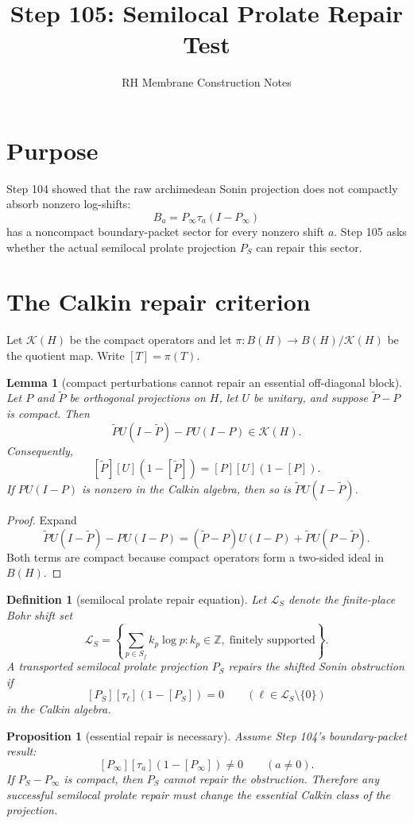 \documentclass[11pt]{article}
\title{Step 105: Semilocal Prolate Repair Test}
\author{RH Membrane Construction Notes}
\date{}
\newtheorem{lemma}{Lemma}
\newtheorem{proposition}{Proposition}
\newtheorem{definition}{Definition}
\begin{document}
\maketitle

\section{Purpose}
Step 104 showed that the raw archimedean Sonin projection does not compactly absorb nonzero log-shifts:
\[
B_a=P_\infty\tau_a(I-P_\infty)
\]
has a noncompact boundary-packet sector for every nonzero shift $a$. Step 105 asks whether the actual semilocal prolate projection $P_S$ can repair this sector.

\section{The Calkin repair criterion}
Let $\mathcal K(H)$ be the compact operators and let $\pi:B(H)\to B(H)/\mathcal K(H)$ be the quotient map. Write $[T]=\pi(T)$.

\begin{lemma}[compact perturbations cannot repair an essential off-diagonal block]
Let $P$ and $\widetilde P$ be orthogonal projections on $H$, let $U$ be unitary, and suppose $\widetilde P-P$ is compact. Then
\[
\widetilde P U(I-\widetilde P)-P U(I-P)\in\mathcal K(H).
\]
Consequently,
\[
[\widetilde P][U](1-[\widetilde P])=[P][U](1-[P]).
\]
If $P U(I-P)$ is nonzero in the Calkin algebra, then so is $\widetilde P U(I-\widetilde P)$.
\end{lemma}

\begin{proof}
Expand
\[
\widetilde P U(I-\widetilde P)-P U(I-P)
=(\widetilde P-P)U(I-P)+\widetilde P U(P-\widetilde P).
\]
Both terms are compact because compact operators form a two-sided ideal in $B(H)$.
\end{proof}

\begin{definition}[semilocal prolate repair equation]
Let $\mathcal L_S$ denote the finite-place Bohr shift set
\[
\mathcal L_S=\left\{\sum_{p\in S_f}k_p\log p: k_p\in\mathbb Z,\; \text{finitely supported}\right\}.
\]
A transported semilocal prolate projection $P_S$ repairs the shifted Sonin obstruction if
\[
[P_S][\tau_\ell](1-[P_S])=0
\qquad(\ell\in\mathcal L_S\setminus\{0\})
\]
in the Calkin algebra.
\end{definition}

\begin{proposition}[essential repair is necessary]
Assume Step 104's boundary-packet result:
\[
[P_\infty][\tau_a](1-[P_\infty])\ne0
\qquad(a\ne0).
\]
If $P_S-P_\infty$ is compact, then $P_S$ cannot repair the obstruction. Therefore any successful semilocal prolate repair must change the essential Calkin class of the projection.
\end{proposition}
\end{document}
